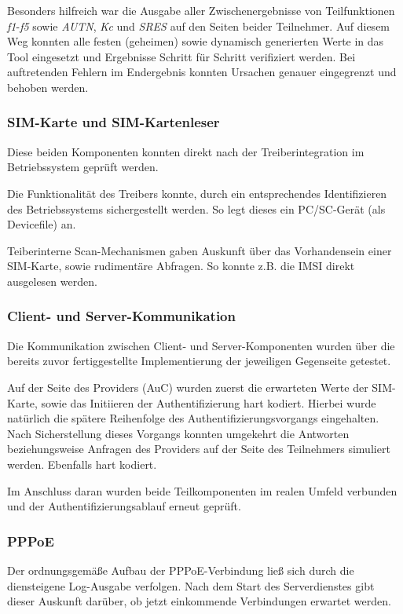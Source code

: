		Besonders hilfreich war die Ausgabe aller Zwischenergebnisse von Teilfunktionen
		\textit{f1}-\textit{f5} sowie \textit{AUTN}, \textit{Kc} und \textit{SRES} auf
		den Seiten beider Teilnehmer. Auf diesem Weg konnten alle festen (geheimen) sowie
		dynamisch generierten Werte in das Tool eingesetzt und Ergebnisse Schritt für
		Schritt verifiziert werden. Bei auftretenden Fehlern im Endergebnis konnten Ursachen
		genauer eingegrenzt und behoben werden.

		\subsubsection[SIM-Karte und SIM-Kartenleser (Schenkel)]{SIM-Karte und SIM-Kartenleser}
		Diese beiden Komponenten konnten direkt nach der Treiberintegration im Betriebssystem
		geprüft werden.

		Die Funktionalität des Treibers konnte, durch ein entsprechendes Identifizieren des
		Betriebssystems sichergestellt werden. So legt dieses ein PC/SC-Gerät (als Devicefile) an.

		Teiberinterne Scan-Mechanismen gaben Auskunft über das Vorhandensein einer SIM-Karte,
		sowie rudimentäre Abfragen. So konnte z.B. die IMSI direkt ausgelesen werden.

		\subsubsection[Client- und Server-Kommunikation (Schenkel)]{Client- und Server-Kommunikation}
		Die Kommunikation zwischen Client- und Server-Komponenten wurden über die bereits zuvor
		fertiggestellte Implementierung der jeweiligen Gegenseite getestet.

		Auf der Seite des Providers (AuC) wurden zuerst die erwarteten Werte der SIM-Karte, sowie
		das Initiieren der Authentifizierung hart kodiert. Hierbei wurde natürlich die spätere
		Reihenfolge des Authentifizierungsvorgangs eingehalten. Nach Sicherstellung dieses Vorgangs
		konnten umgekehrt die Antworten beziehungsweise Anfragen des Providers auf der Seite des Teilnehmers
		simuliert werden. Ebenfalls hart kodiert.

		Im Anschluss daran wurden beide Teilkomponenten im realen Umfeld verbunden und der
		Authentifizierungsablauf erneut geprüft.

		\subsubsection[PPPoE (Schenkel)]{PPPoE}
		Der ordnungsgemäße Aufbau der PPPoE-Verbindung ließ sich durch die diensteigene
		Log-Ausgabe verfolgen. Nach dem Start des Serverdienstes gibt dieser Auskunft
		darüber, ob jetzt einkommende Verbindungen erwartet werden.

